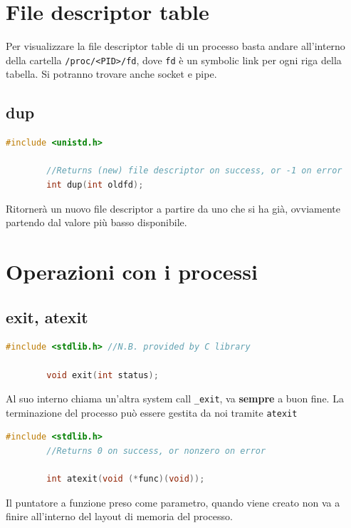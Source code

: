 \documentclass[a4paper, 12pt]{book}
\begin{document}
    \section{File descriptor table}

    Per visualizzare la file descriptor table di un processo
    basta andare all'interno della cartella 
    \verb|/proc/<PID>/fd|, dove \verb|fd| è un symbolic 
    link per ogni riga della tabella. Si potranno trovare 
    anche socket e pipe.
    
    \subsection{dup}

    \begin{lstlisting}[language=C]
        #include <unistd.h>

        //Returns (new) file descriptor on success, or -1 on error
        int dup(int oldfd);
    \end{lstlisting} 
    Ritornerà un nuovo file descriptor a partire da uno 
    che si ha già, ovviamente partendo dal valore più basso
    disponibile.

    \section{Operazioni con i processi}

    \subsection{exit, atexit}

    \begin{lstlisting}[language=C]
        #include <stdlib.h> //N.B. provided by C library

        void exit(int status);
    \end{lstlisting} 
    Al suo interno chiama un'altra system call \verb|_exit|,
    va \textbf{sempre} a buon fine. La terminazione 
    del processo può essere gestita da noi tramite
    \verb|atexit|
    
    \begin{lstlisting}[language=C]
        #include <stdlib.h> 
        //Returns 0 on success, or nonzero on error

        int atexit(void (*func)(void));
    \end{lstlisting} 
    Il puntatore a funzione preso come parametro, quando 
    viene creato non va a finire all'interno del layout 
    di memoria del processo.
\end{document}
